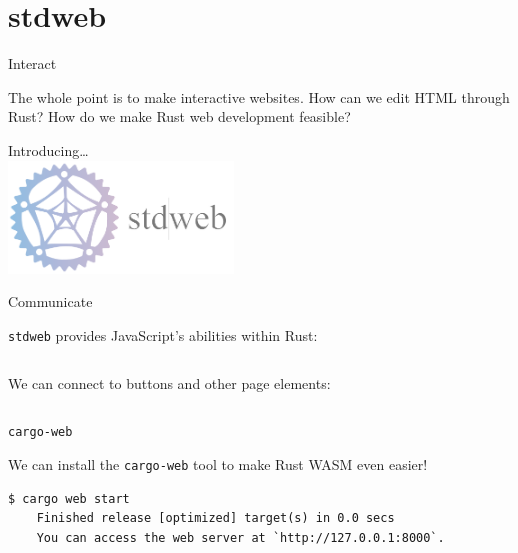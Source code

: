 \documentclass{lug}
\begin{document}
\renewcommand{\secimage}{graphics/stdweb_logo}
\section{stdweb}

\begin{frame}{Interact}

    The whole point is to make interactive websites. How can we edit HTML
    through Rust? How do we make Rust web development feasible?

    \vspace{1cm}

    \begin{center}
        Introducing\dots\\
        \vspace{0.2cm}
        \includegraphics[height=3cm]{graphics/stdweb.png}
    \end{center}
    
\end{frame}

\begin{frame}{Communicate}

    \texttt{stdweb} provides JavaScript's abilities within Rust:
    
    \inputminted[fontsize=\footnotesize]{rust}{code/js.sw.rs}
    
    We can connect to buttons and other page elements:
    
    \inputminted[fontsize=\footnotesize]{rust}{code/button.sw.rs}
    
\end{frame}

\begin{frame}[fragile]{\texttt{cargo-web}}

    We can install the \texttt{cargo-web} tool to make Rust WASM even easier!

    \begin{verbatim}
$ cargo web start
    Finished release [optimized] target(s) in 0.0 secs
    You can access the web server at `http://127.0.0.1:8000`.
    \end{verbatim}
    
\end{frame}
\end{document}
